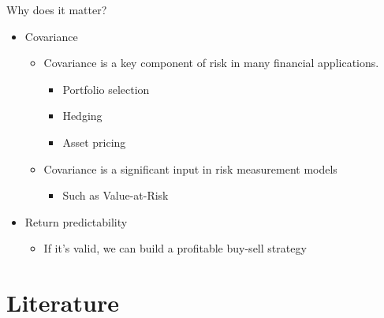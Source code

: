 \documentclass[handout]{beamer}
\begin{document}
	\begin{frame}{Why does it matter?}
		\begin{itemize}
			\item Covariance
			\begin{itemize}
				\item Covariance is a key component of risk in
				many financial applications.
				\begin{itemize}\scriptsize
					\item Portfolio selection
					\item Hedging 
					\item Asset pricing
				\end{itemize}
				\small
				\item Covariance is a significant input in risk measurement models 
				\begin{itemize}\scriptsize
					\item  Such as Value-at-Risk
				\end{itemize}
				
			\end{itemize}
			\item Return predictability
			\begin{itemize}
				\item If it's valid, we can build a profitable buy-sell strategy
			\end{itemize}
		\end{itemize}
		
	\end{frame}
	
	
	
	\section{Literature}
	

	

	
	
	
	
	\normalsize
	
\end{document}
